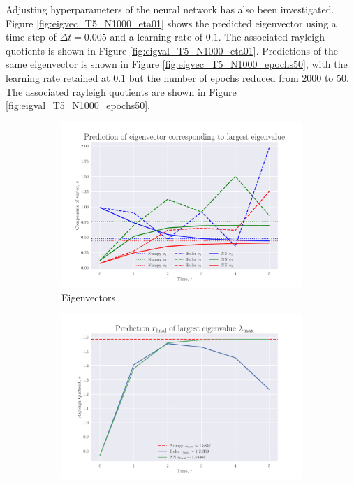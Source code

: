 \documentclass[12pt]{extarticle}
\begin{document}
Adjusting hyperparameters of the neural network has also been investigated. Figure \ref{fig:eigvec_T5_N1000_eta01} shows the predicted eigenvector using a time step of $\Delta t = 0.005$ and a learning rate of $0.1$. The associated rayleigh quotients is shown in Figure \ref{fig:eigval_T5_N1000_eta01}. Predictions of the same eigenvector is shown in Figure \ref{fig:eigvec_T5_N1000_epochs50}, with the learning rate retained at $0.1$ but the number of epochs reduced from $2000$ to $50$. The associated rayleigh quotients are shown in Figure \ref{fig:eigval_T5_N1000_epochs50}.

\begin{figure}[h]
	
	\centering
	\begin{subfigure}{0.49\textwidth}
		\centering
		\includegraphics[width=\textwidth]{../output/plots/eigvec_T5_N6.pdf}
		\caption{Eigenvectors}
		\label{fig:eigvec_T5_N6}
	\end{subfigure}
	\hfill
	\begin{subfigure}{0.49\textwidth}
		\centering
		\includegraphics[width=\textwidth]{../output/plots/eigval_T5_N6.pdf}

\end{subfigure}
\end{figure}
\end{document}
